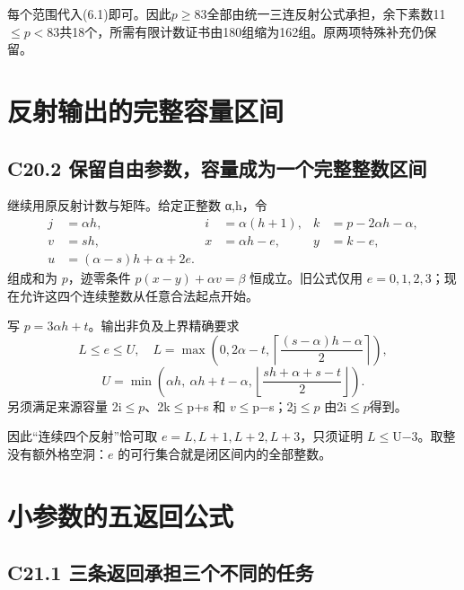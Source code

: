 \documentclass[11pt,a4paper]{article}
\theoremstyle{definition}
\numberwithin{equation}{section}
\begin{document}
{每个范围代入(6.1)即可。因此\ensuremath{p}\ensuremath{\ge}83全部由统一三连反射公式承担，余下素数11\ensuremath{\le}\ensuremath{p<83}共18个，所需有限计数证书由180组缩为162组。原两项特殊补充仍保留。}


\section{反射输出的完整容量区间}\label{construct:capacity-interval}
\subsection*{\texorpdfstring{{C20.2} {保留自由参数，容量成为一个完整整数区间}}{C20.2 保留自由参数，容量成为一个完整整数区间}}\label{C20-h139}

{继续用原反射计数与矩阵。给定正整数} {α,h，令} \[
\begin{aligned}
j&=\alpha h,& i&=\alpha(h+1),& k&=p-2\alpha h-\alpha,\\
v&=sh,&x&=\alpha h-e,&y&=k-e,\\
u&=(\alpha-s)h+\alpha+2e.
\end{aligned}
\tag{C20.2.1}
\] {组成和为} {\ensuremath{p}，迹零条件} {\ensuremath{p(x-y)+\alpha v=\beta }} {恒成立。旧公式仅用} {\ensuremath{e=0,1,2,3}；现在允许这四个连续整数从任意合法起点开始。}

{写} {\ensuremath{p=3\alpha h+t}。输出非负及上界精确要求} \[
L\le e\le U,
\quad
L=\max\left(0,2\alpha-t,
\left\lceil\frac{(s-\alpha)h-\alpha}{2}\right\rceil\right),
\] \[
U=\min\left(\alpha h,\ \alpha h+t-\alpha,
\left\lfloor\frac{sh+\alpha+s-t}{2}\right\rfloor\right).
\tag{C20.2.2}
\] {另须满足来源容量} {2i\ensuremath{\le}\ensuremath{p}、2k\ensuremath{\le}p+s} {和} {\ensuremath{v}\ensuremath{\le}p−s；2j\ensuremath{\le}\ensuremath{p}} {由2i\ensuremath{\le}\ensuremath{p}得到。}

{因此``连续四个反射''恰可取} {\ensuremath{e=L,L+1,L+2,L+3}，只须证明} {\ensuremath{L}\ensuremath{\le}U−3。取整没有额外格空洞：\ensuremath{e}} {的可行集合就是闭区间内的全部整数。}


\section{小参数的五返回公式}\label{construct:five-returns}
\subsection*{\texorpdfstring{{C21.1} {三条返回承担三个不同的任务}}{C21.1 三条返回承担三个不同的任务}}\label{C21-h140}
\end{document}
